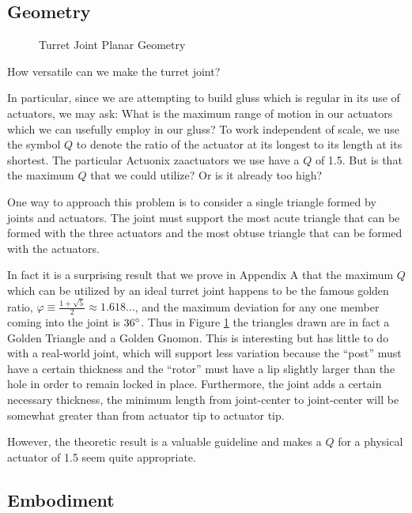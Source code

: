 \documentclass[11pt]{article}
\begin{document}
\subsection{Geometry}

\begin{figure}[!ht]
  \centering
    \caption[Turret Joint Planar Geometry]{Turret Joint Planar Geometry}
      \label{simplified-constraint-drawing}
\end{figure}

How versatile can we make the turret joint?

In particular, since we are attempting to build gluss which is regular in its use of actuators, we may ask:
What is the maximum range of motion in our
actuators which we can usefully employ in our gluss?
To work independent of scale, we use the symbol $Q$ to denote the ratio of the actuator at its
longest to its length at its shortest.
The particular Actuonix zaactuators we use have a $Q$ of 1.5. But is that the maximum $Q$ that we could utilize? Or is
it already too high?

One way to approach this problem is to consider a single triangle formed by joints and actuators.
The joint must support the most acute triangle
that can be formed with the three actuators and the most obtuse triangle that can be formed with the actuators.

In fact it is a surprising result that we prove in Appendix A that the maximum $Q$ which can be utilized
by an ideal turret joint happens to be
the famous golden ratio, $\varphi \equiv \frac{1 + \sqrt{5}}{2} \approx 1.618...$, and the maximum deviation for any one member coming
into the joint is $36\degree$.
Thus in Figure \ref{simplified-constraint-drawing} the triangles drawn are in fact a Golden Triangle and a Golden Gnomon.
This is interesting but has little to
do with a real-world joint, which will support less variation because the ``post'' must have a
certain thickness and the ``rotor'' must have a lip
slightly larger than the hole in order to remain locked in place.
Furthermore, the joint adds a certain necessary thickness, the minimum length
 from joint-center to joint-center will be somewhat greater than from actuator tip to actuator tip.

 However, the theoretic result is a valuable guideline and makes a $Q$ for a physical actuator of 1.5 seem quite appropriate.

 \subsection{Embodiment}
\end{document}
